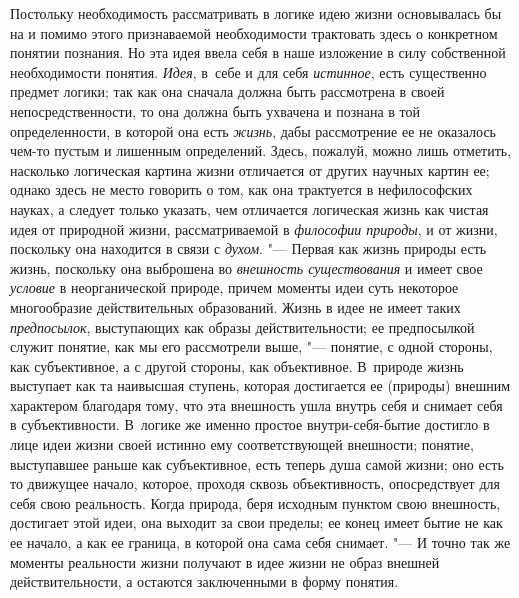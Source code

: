 Постольку необходимость рассматривать в логике идею жизни
основывалась бы на и помимо этого признаваемой необходимости трактовать
здесь о конкретном понятии познания. Но эта идея ввела себя в наше
изложение в силу собственной необходимости понятия.
{\em Идея}, в~себе и для
себя {\em истинное}, есть
существенно предмет логики; так как она сначала должна быть рассмотрена в
своей непосредственности, то она должна быть ухвачена и познана в той
определенности, в которой она есть
{\em жизнь}, дабы
рассмотрение ее не оказалось чем-то пустым и лишенным определений. Здесь,
пожалуй, можно лишь отметить, насколько логическая картина жизни отличается
от других научных картин ее; однако здесь не место говорить о том, как она
трактуется в нефилософских науках, а следует только указать, чем отличается
логическая жизнь как чистая идея от природной жизни, рассматриваемой в
{\em философии природы},
и от жизни, поскольку она находится в связи с
{\em духом}. "--- Первая как
жизнь природы есть жизнь, поскольку она выброшена во
{\em внешность существования}
и имеет свое
{\em условие} в
неорганической природе, причем моменты идеи суть некоторое многообразие
действительных образований. Жизнь в идее не имеет таких
{\em предпосылок},
выступающих как образы действительности; ее предпосылкой
служит понятие, как мы его рассмотрели выше, "--- понятие, с
одной стороны, как субъективное, а с другой стороны, как объективное.
В~природе жизнь выступает как та наивысшая ступень, которая достигается ее
(природы) внешним характером благодаря тому, что эта внешность ушла внутрь
себя и снимает себя в субъективности. В~логике же именно простое
внутри-себя-бытие достигло в лице идеи жизни своей истинно ему
соответствующей внешности; понятие, выступавшее раньше как субъективное,
есть теперь душа самой жизни; оно есть то движущее начало, которое, проходя
сквозь объективность, опосредствует для себя свою реальность. Когда
природа, беря исходным пунктом свою внешность, достигает этой идеи, она
выходит за свои пределы; ее конец имеет бытие не как ее начало, а как ее
граница, в которой она сама себя снимает. "--- И точно так же
моменты реальности жизни получают в идее жизни не образ
внешней действительности, а остаются заключенными в форму понятия.


